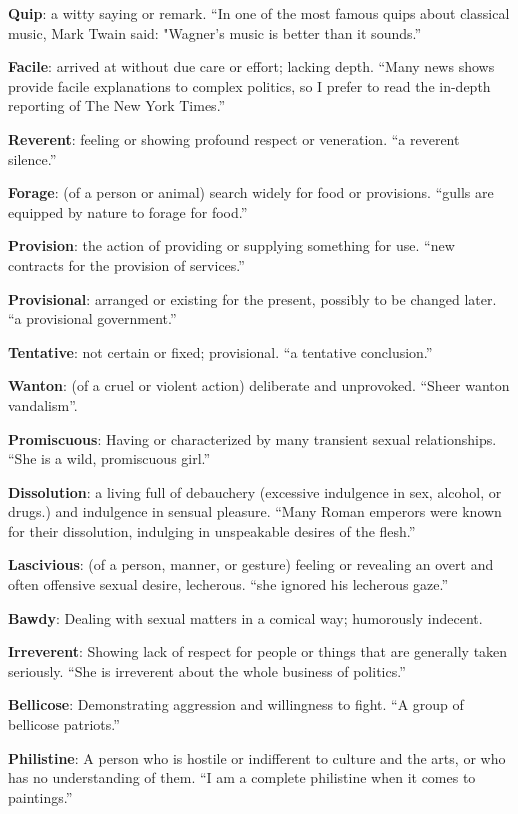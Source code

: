 \documentclass[12pt, a4paper]{ximera}
\begin{document}
\textbf{Quip}: a witty saying or remark. ``In one of the most famous quips about classical music, Mark Twain said: "Wagner's music is better than it sounds.''

\textbf{Facile}: arrived at without due care or effort; lacking depth. ``Many news shows provide facile explanations to complex politics, so I prefer to read the in-depth reporting of The New York Times.''

\textbf{Reverent}: feeling or showing profound respect or veneration. ``a reverent silence.''

\textbf{Forage}: (of a person or animal) search widely for food or provisions. ``gulls are equipped by nature to forage for food.''

\textbf{Provision}: the action of providing or supplying something for use. ``new contracts for the provision of services.''

\textbf{Provisional}: arranged or existing for the present, possibly to be changed later. ``a provisional government.''

\textbf{Tentative}: not certain or fixed; provisional. ``a tentative conclusion.''

\textbf{Wanton}: (of a cruel or violent action) deliberate and unprovoked. ``Sheer wanton vandalism''.

\textbf{Promiscuous}: Having or characterized by many transient sexual relationships. ``She is a wild, promiscuous girl.''

\textbf{Dissolution}: a living full of debauchery (excessive indulgence in sex, alcohol, or drugs.) and indulgence in sensual pleasure. ``Many Roman emperors were known for their dissolution, indulging in unspeakable desires of the flesh.''

\textbf{Lascivious}: (of a person, manner, or gesture) feeling or revealing an overt and often offensive sexual desire, lecherous. ``she ignored his lecherous gaze.''

\textbf{Bawdy}: Dealing with sexual matters in a comical way; humorously indecent.

\textbf{Irreverent}: Showing lack of respect for people or things that are generally taken seriously. ``She is irreverent about the whole business of politics.''

\textbf{Bellicose}: Demonstrating aggression and willingness to fight. ``A group of bellicose patriots.''

\textbf{Philistine}: A person who is hostile or indifferent to culture and the arts, or who has no understanding of them. ``I am a complete philistine when it comes to paintings.''
\end{document}
